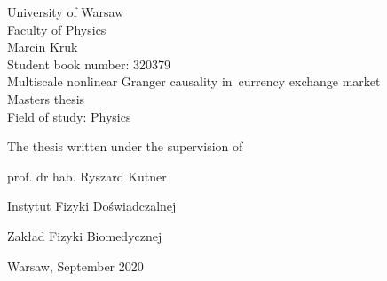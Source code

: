 \thispagestyle{empty}
\vspace*{2cm}
\begin{center}
{\huge University of Warsaw\\ \vspace{0.3cm}
Faculty of Physics}\\
\vspace{1.5cm}
Marcin Kruk\\
Student book number: 320379\\
\vspace{1.5cm}
{\huge Multiscale nonlinear Granger causality \mbox{in currency} exchange market}\\
\vspace{2cm}
Masters thesis\\
Field of study: Physics
\end{center}
\vspace{3cm}
\hfill The thesis written under the supervision of\vspace{0.2cm}

\hfill prof. dr hab. Ryszard Kutner

\hfill Instytut Fizyki Doświadczalnej

\hfill Zakład Fizyki Biomedycznej
\vfill
\begin{center}
{\large Warsaw, September 2020}\\
\end{center}
